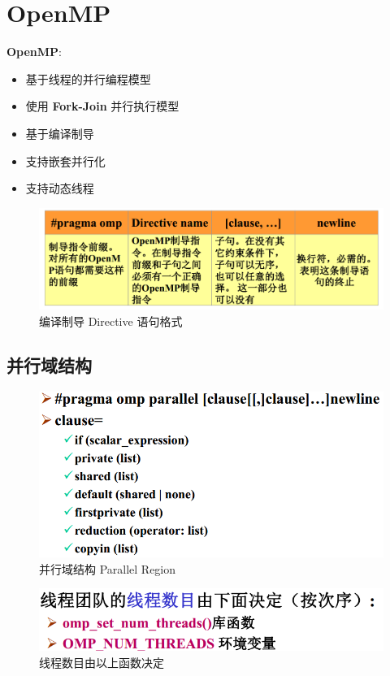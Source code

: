 \documentclass[UTF8,a4paper]{ctexart}
\begin{document}
\section{OpenMP}
\textbf{OpenMP}:
\begin{itemize}
  \item 基于线程的并行编程模型
  \item 使用 \textbf{Fork-Join} 并行执行模型
  \item 基于编译制导
  \item 支持嵌套并行化
  \item 支持动态线程
\end{itemize}

\begin{figure}[H]
  \centering
  \includegraphics[scale = 0.3]{assets/ParallelComputing_d5680.png}
  \caption{编译制导 Directive 语句格式}
\end{figure}

\subsection{并行域结构}

\begin{figure}[H]
  \centering
  \includegraphics[scale = 0.3]{assets/ParallelComputing_47303.png}
  \caption{并行域结构 Parallel Region}
\end{figure}

\begin{figure}[H]
  \centering
  \includegraphics[scale = 0.3]{assets/ParallelComputing_e178d.png}
  \caption{线程数目由以上函数决定}
\end{figure}
\end{document}
